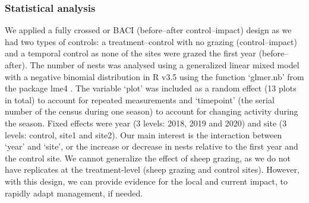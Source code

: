 \documentclass[10pt, twoside]{book} %
\begin{document}
	\subsubsection{Statistical analysis}
	We applied a fully crossed or BACI (before--after control--impact) design \citep{smith2002} as we had two types of controls: a treatment--control with no grazing (control--impact) and a temporal control as none of the sites were grazed the first year (before--after). The number of nests was analysed using a generalized linear mixed model with a negative binomial distribution in R v3.5 \citep{rcoreteam2020} using the function `glmer.nb' from the package lme4 \citep{bates2015}. The variable `plot' was included as a random effect (13 plots in total) to account for repeated measurements and `timepoint' (the serial number of the census during one season) to account for changing activity during the season. Fixed effects were year (3 levels: 2018, 2019 and 2020) and site (3 levels: control, site1 and site2). Our main interest is the interaction between `year' and `site', or the increase or decrease in nests relative to the first year and the control site. We cannot generalize the effect of sheep grazing, as we do not have replicates at the treatment-level (sheep grazing and control sites). However, with this design, we can provide evidence for the local and current impact, to rapidly adapt management, if needed.\\
	
\end{document}
